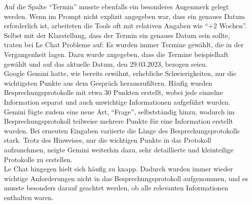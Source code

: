 Auf die Spalte ``Termin'' musste ebenfalls ein besonderes Augenmerk gelegt werden. Wenn im Prompt nicht explizit angegeben war, dass ein 
genaues Datum erforderlich ist, arbeiteten die Tools oft mit relativen Angaben wie ``+2 Wochen''. Selbst mit der Klarstellung, dass der 
Termin ein genaues Datum sein sollte, traten bei Le Chat Probleme auf: Es wurden immer Termine gewählt, die in der Vergangenheit lagen. 
Dazu wurde angegeben, dass die Termine beispielhaft gewählt und auf das aktuelle Datum, den 29.03.2023, bezogen seien.\\

Google Gemini hatte, wie bereits erwähnt, erhebliche Schwierigkeiten, nur die wichtigsten Punkte aus dem Gespräch herauszufiltern. 
Häufig wurden Besprechungsprotokolle mit etwa 30 Punkten erstellt, wobei jede einzelne Information separat und auch unwichtige 
Informationen aufgeführt wurden. Gemini fügte zudem eine neue Art, ``Frage'', selbstständig hinzu, wodurch im Besprechungsprotokoll 
teilweise mehrere Punkte für eine Information erstellt wurden. Bei erneuten Eingaben variierte die Länge des Besprechungsprotokolls 
stark. Trotz des Hinweises, nur die wichtigen Punkte in das Protokoll aufzunehmen, neigte Gemini weiterhin dazu, sehr detaillierte und 
kleinteilige Protokolle zu erstellen.\\

Le Chat hingegen hielt sich häufig zu knapp. Dadurch wurden immer wieder wichtige Anforderungen nicht in das Besprechungsprotokoll 
aufgenommen, und es musste besonders darauf geachtet werden, ob alle relevanten Informationen enthalten waren.

